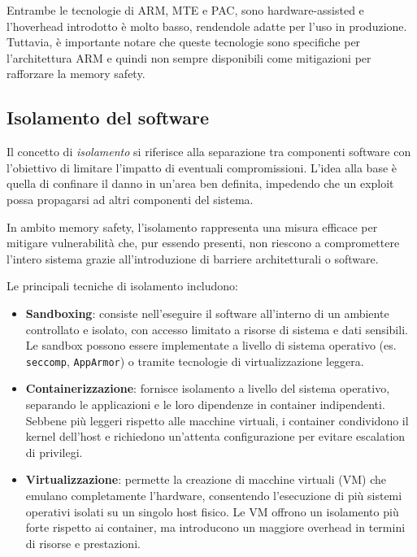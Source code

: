 \bigskip
\noindent
Entrambe le tecnologie di ARM, MTE e PAC, sono hardware-assisted e l'hoverhead
introdotto è molto basso, rendendole adatte per l'uso in produzione. Tuttavia, è
importante notare che queste tecnologie sono specifiche per l'architettura ARM e
quindi non sempre disponibili come mitigazioni per rafforzare la memory safety.

\subsection{Isolamento del software}
\label{sec:isolation}

Il concetto di \textit{isolamento} si riferisce alla separazione tra componenti software
con l'obiettivo di limitare l'impatto di eventuali compromissioni. L'idea alla
base è quella di confinare il danno in un'area ben definita, impedendo che un exploit
possa propagarsi ad altri componenti del sistema.

In ambito memory safety, l'isolamento rappresenta una misura efficace per
mitigare vulnerabilità che, pur essendo presenti, non riescono a compromettere l'intero
sistema grazie all'introduzione di barriere architetturali o software.

Le principali tecniche di isolamento includono:
\begin{itemize}
  \item \textbf{Sandboxing}: consiste nell'eseguire il software all'interno di un
    ambiente controllato e isolato, con accesso limitato a risorse di sistema e
    dati sensibili. Le sandbox possono essere implementate a livello di sistema operativo
    (es. \texttt{seccomp}, \texttt{AppArmor}) o tramite tecnologie di virtualizzazione
    leggera.

  \item \textbf{Containerizzazione}: fornisce isolamento a livello del sistema operativo,
    separando le applicazioni e le loro dipendenze in container indipendenti. Sebbene
    più leggeri rispetto alle macchine virtuali, i container condividono il
    kernel dell'host e richiedono un'attenta configurazione per evitare
    escalation di privilegi.

  \item \textbf{Virtualizzazione}: permette la creazione di macchine virtuali (VM)
    che emulano completamente l'hardware, consentendo l'esecuzione di più
    sistemi operativi isolati su un singolo host fisico. Le VM offrono un isolamento
    più forte rispetto ai container, ma introducono un maggiore overhead in
    termini di risorse e prestazioni.
\end{itemize}

